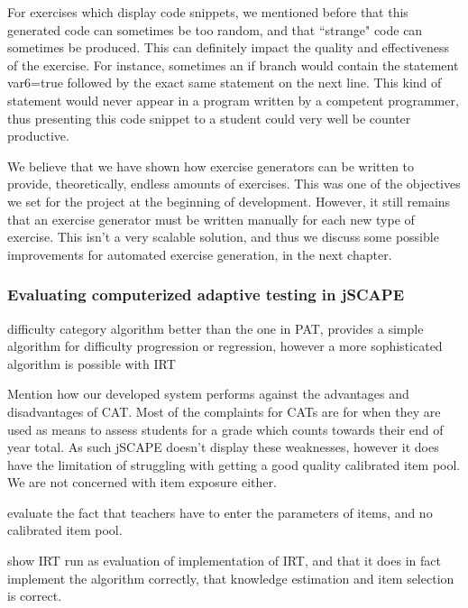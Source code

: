 For exercises which display code snippets, we mentioned before that this generated code can sometimes be too random, and that ``strange" code can sometimes be produced. This can definitely impact the quality and effectiveness of the exercise. For instance, sometimes an \textsf{if} branch would contain the statement \textsf{var6=true} followed by the exact same statement on the next line. This kind of statement would never appear in a program written by a competent programmer, thus presenting this code snippet to a student could very well be counter productive. \newline

We believe that we have shown how exercise generators can be written to provide, theoretically, endless amounts of exercises. This was one of the objectives we set for the project at the beginning of development. However, it still remains that an exercise generator must be written manually for each new type of exercise. This isn't a very scalable solution, and thus we discuss some possible improvements for automated exercise generation, in the next chapter.

\subsubsection{Evaluating computerized adaptive testing in jSCAPE}
difficulty category algorithm better than the one in PAT, provides a simple algorithm for difficulty progression or regression, however a more sophisticated algorithm is possible with IRT

Mention how our developed system performs against the advantages and disadvantages of CAT. Most of the complaints for CATs are for when they are used as means to assess students for a grade which counts towards their end of year total. As such jSCAPE doesn't display these weaknesses, however it does have the limitation of struggling with getting a good quality calibrated item pool. We are not concerned with item exposure either.\newline

evaluate the fact that teachers have to enter the parameters of items, and no calibrated item pool.\newline

show IRT run as evaluation of implementation of IRT, and that it does in fact implement the algorithm correctly, that knowledge estimation and item selection is correct.

